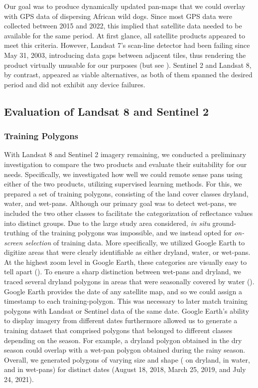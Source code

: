 \documentclass[../FinalThesis.tex]{subfiles}
\begin{document}
\noindent Our goal was to produce dynamically updated pan-maps that we could
overlay with GPS data of dispersing African wild dogs. Since most GPS data were
collected between 2015 and 2022, this implied that satellite data needed to be
available for the same period. At first glance, all satellite products appeared
to meet this criteria. However, Landsat 7's scan-line detector had been failing
since May 31, 2003, introducing data gaps between adjacent tiles, thus rendering
the product virtually unusable for our purposes (but see \citealp{Storey.2005}).
Sentinel 2 and Landsat 8, by contrast, appeared as viable alternatives, as both
of them spanned the desired period and did not exhibit any device failures.

\subsection{Evaluation of Landsat 8 and Sentinel 2}
\subsubsection{Training Polygons}

With Landsat 8 and Sentinel 2 imagery remaining, we conducted a preliminary
investigation to compare the two products and evaluate their suitability for our
needs. Specifically, we investigated how well we could remote sense pans using
either of the two products, utilizing supervised learning methods. For this, we
prepared a set of training polygons, consisting of the land cover classes
dryland, water, and wet-pans. Although our primary goal was to detect wet-pans,
we included the two other classes to facilitate the categorization of
reflectance values into distinct groups. Due to the large study area considered,
\textit{in situ} ground-truthing of the training polygons was impossible, and we
instead opted for \textit{on-screen selection} of training data. More
specifically, we utilized Google Earth to digitize areas that were clearly
identifiable as either dryland, water, or wet-pans. At the highest zoom level in
Google Earth, these categories are visually easy to tell apart
(). To ensure a sharp distinction between wet-pans and dryland,
we traced several dryland polygons in areas that were seasonally covered by
water (). Google Earth provides the date of any satellite map,
and so we could assign a timestamp to each training-polygon. This was necessary
to later match training polygons with Landsat or Sentinel data of the same date.
Google Earth's ability to display imagery from different dates furthermore
allowed us to generate a training dataset that comprised polygons that belonged
to different classes depending on the season. For example, a dryland polygon
obtained in the dry season could overlap with a wet-pan polygon obtained during
the rainy season. Overall, we generated 
polygons of varying size and shape ( on
dryland,  in water, and
 in wet-pans) for
 distinct dates (August 18, 2018, March 25,
2019, and July 24, 2021).
\end{document}
